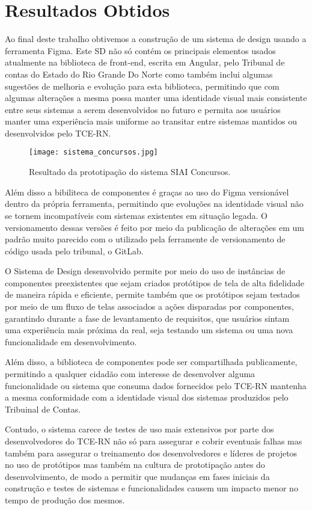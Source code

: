 \chapter[Capítulo 5]{Resultados Obtidos}
\label{ch:cap5}

Ao final deste trabalho obtivemos a construção de um sistema de design usando a ferramenta Figma. Este SD não só contém os principais elementos usados atualmente na biblioteca de front-end, escrita em Angular, pelo Tribunal de contas do Estado do Rio Grande Do Norte como também inclui algumas sugestões de melhoria e evolução para esta biblioteca, permitindo que com algumas alterações a mesma possa manter uma identidade visual mais consistente entre seus sistemas a serem desenvolvidos no futuro e permita aos usuários manter uma experiência mais uniforme ao transitar entre sistemas mantidos ou desenvolvidos pelo TCE-RN.

\begin{figure}[h!]
  \texttt{[image: sistema\_concursos.jpg]}
  \caption{Resultado da prototipação do sistema SIAI Concursos.}
  \label{fig:sistema_concursos}
\end{figure}

Além disso a bibiliteca de componentes é graças ao uso do Figma versionável dentro da própria ferramenta, permitindo que evoluções na identidade visual não se tornem incompatíveis com sistemas existentes em situação legada. O versionamento dessas versões é feito por meio da publicação de alterações em um padrão muito parecido com o utilizado pela ferramente de versionamento de código usada pelo tribunal, o GitLab.

O Sistema de Design desenvolvido permite por meio do uso de instâncias de componentes preexistentes que sejam criados protótipos de tela de alta fidelidade de maneira rápida e eficiente, permite também que os protótipos sejam testados por meio de um fluxo de telas associados a ações disparadas por componentes, garantindo durante a fase de levantamento de requisitos, que usuários sintam uma experiência mais próxima da real, seja testando um sistema ou uma nova funcionalidade em desenvolvimento.

Além disso, a biblioteca de componentes pode ser compartilhada publicamente, permitindo a qualquer cidadão com interesse de desenvolver alguma funcionalidade ou sistema que consuma dados fornecidos pelo TCE-RN mantenha a mesma conformidade com a identidade visual dos sistemas produzidos pelo Tribuinal de Contas.

Contudo, o sistema carece de testes de uso mais extensivos por parte dos desenvolvedores do TCE-RN não só para assegurar e cobrir eventuais falhas mas também para assegurar o treinamento dos desenvolvedores e líderes de projetos no uso de protótipos mas também na cultura de prototipação antes do desenvolvimento, de modo a permitir que mudanças em fases iniciais da construção e testes de sistemas e funcionalidades causem um impacto menor no tempo de produção dos mesmos.

